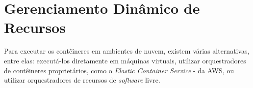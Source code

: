 



\section{Gerenciamento Dinâmico de Recursos}

Para executar os contêineres em ambientes de nuvem, existem várias alternativas, entre elas: executá-los diretamente em máquinas virtuais, utilizar orquestradores de contêineres proprietários, como o \textit{Elastic Container Service} - \cite{awsecs} da AWS, ou utilizar orquestradores de recursos de \textit{software} livre.



